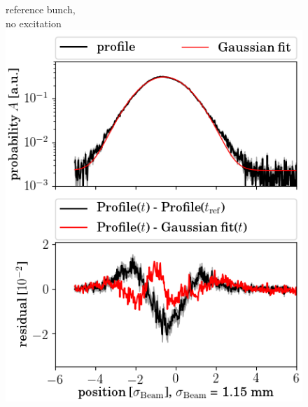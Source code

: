\documentclass[%
 reprint,
 amsmath,amssymb,
 aps,
prstab,
]{revtex4-1}
\begin{document}
\begin{figure}[h]
	\begin{minipage}[t]{0.49\linewidth}
		\centering
		reference bunch,\\ no excitation
		\includegraphics[width=1.0\linewidth]{profile_v_7thhv_slot_2862.png}
	\end{minipage}
	\begin{minipage}[t]{0.49\linewidth}
		\centering

\end{minipage}
\end{figure}
\end{document}
